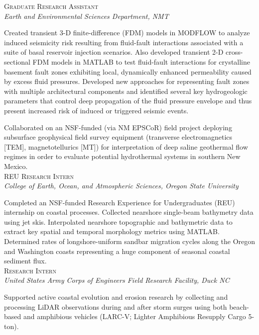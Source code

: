 \documentclass[11pt, letterpaper]{article}
\newcommand{\years}[1]{\marginnote{\scriptsize #1}}
\begin{document}
\noindent
\years{2016 - 2017}\textsc{Graduate Research Assistant}\\
\textit{Earth and Environmental Sciences Department, NMT}

    \vspace{3pt} \noindent  
    Created transient 3-D finite-difference (FDM) models in MODFLOW to analyze
    induced seismicity risk resulting from fluid-fault interactions associated
    with a suite of basal reservoir injection scenarios. Also developed
    transient 2-D cross-sectional FDM models in MATLAB to test fluid-fault
    interactions for crystalline basement fault zones exhibiting local,
    dynamically enhanced permeability caused by excess fluid pressures. 
    Developed new approaches for representing fault zones with multiple
    architectural components and identified several key hydrogeologic
    parameters that control deep propagation of the fluid pressure envelope and
    thus present increased risk of induced or triggered seismic events.

	Collaborated on an NSF-funded (via NM EPSCoR) field project deploying
	subsurface geophysical field survey equipment (transverse electromagnetics [TEM],
	magnetotellurics [MT]) for interpretation of deep saline geothermal flow
	regimes in order to evaluate potential hydrothermal systems in southern New
	Mexico.\\

\noindent
\years{2013}\textsc{REU Research Intern}\\
\textit{College of Earth, Ocean, and Atmospheric Sciences, Oregon State University}

    \vspace{3pt} \noindent  
    Completed an NSF-funded Research Experience for Undergraduates (REU)
    internship on coastal processes. Collected nearshore single-beam bathymetry
    data using jet skis. Interpolated nearshore topographic and bathymetric
    data to extract key spatial and temporal morphology metrics using MATLAB.
    Determined rates of longshore-uniform sandbar migration cycles along the
    Oregon and Washington coasts representing a huge component of seasonal
    coastal sediment flux.\\

\noindent
\years{2013}\textsc{Research Intern}\\
\textit{United States Army Corps of Engineers Field Research Facility, Duck NC}

    \vspace{3pt} \noindent  
    Supported active coastal evolution and erosion research by collecting and
    processing LiDAR observations during and after storm surges using both
    beach-based and amphibious vehicles (LARC-V; Lighter Amphibious Resupply
    Cargo 5-ton).
\end{document}
